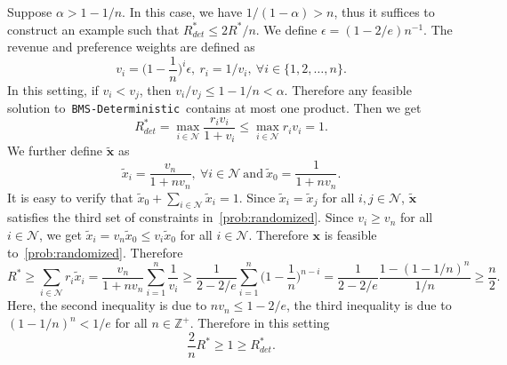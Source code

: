 \documentclass[mnsc,non-blindrev]{informs3}
\theoremstyle{definition}
\begin{document}
\begin{appendices}{\Large{}}
Suppose $\alpha>1-1/n$. In this case, we have $1/(1-\alpha)>n$, thus it suffices to construct an example such that $R^*_{det}\leq 2R^*/n$. We define $\epsilon=(1-2/e)n^{-1}$. The revenue and preference weights are defined as
\begin{equation*}
v_i=\Big(1-\dfrac{1}{n}\Big)^i\epsilon,\ r_i=1/v_i,\ \forall i\in\{1,2,\dots,n\}.
\end{equation*}
In this setting, if $v_i<v_j$, then $v_i/v_j\leq 1-1/n<\alpha$. Therefore any feasible solution to~\texttt{BMS-Deterministic}~contains at most one product. Then we get
\begin{equation*}
R^*_{det}=\max_{i\in\mathcal{N}}\dfrac{r_iv_i}{1+v_i}\leq \max_{i\in\mathcal{N}}r_iv_i=1.
\end{equation*}
We further define $\tilde{\bm{x}}$ as
\begin{equation*}
\tilde{x}_i=\dfrac{v_n}{1+nv_n},\ \forall i\in\mathcal{N}\ \text{and}\ \tilde{x}_0=\dfrac{1}{1+nv_n}.
\end{equation*}
It is easy to verify that $\tilde{x}_0+\sum_{i\in\mathcal{N}}\tilde{x}_i=1$. Since $\tilde{x}_i=\tilde{x}_j$ for all $i,j\in\mathcal{N}$, $\tilde{\bm{x}}$ satisfies the third set of constraints in~\ref{prob:randomized}. Since $v_i\geq v_n$ for all $i\in\mathcal{N}$, we get $\tilde{x}_i=v_n\tilde{x}_0\leq v_i\tilde{x}_0$ for all $i\in\mathcal{N}$. Therefore $\bm{x}$ is feasible to~\ref{prob:randomized}. Therefore
\begin{equation*}
R^*\geq\sum_{i\in\mathcal{N}}r_i\tilde{x}_i=\dfrac{v_n}{1+nv_n}\sum_{i=1}^n \dfrac{1}{v_i}\geq \dfrac{1}{2-2/e}\sum_{i=1}^n\Big(1-\dfrac{1}{n}\Big)^{n-i}=\dfrac{1}{2-2/e}\dfrac{1-(1-1/n)^n}{1/n}\geq \dfrac{n}{2}.
\end{equation*}
Here, the second inequality is due to $nv_n\leq 1-2/e$, the third inequality is due to $(1-1/n)^n<1/e$ for all $n\in\mathbb{Z}^+$. Therefore in this setting
\begin{equation*}
\dfrac{2}{n}R^*\geq 1\geq R^*_{det}.
\end{equation*}


\end{appendices}
\end{document}
